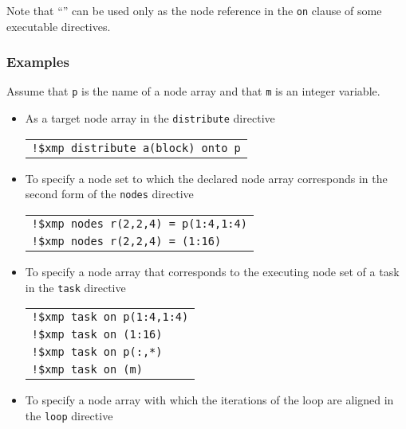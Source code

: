 Note that ``{\tt *}'' can be used only as the node reference in
the {\tt on} clause of some executable directives.


\subsubsection*{Examples}

Assume that {\tt p} is the name of a node array and that {\tt m} is an
integer variable.

\begin{itemize}
\item As a target node array in the {\tt distribute} directive

\begin{tabular}{l}
\verb|!$xmp distribute a(block) onto p| \\
\end{tabular}%

\item To specify a node set to which the declared node array corresponds
      in the second form of the {\tt nodes} directive

\begin{tabular}{l}
\verb|!$xmp nodes r(2,2,4) = p(1:4,1:4)| \\
\verb|!$xmp nodes r(2,2,4) = (1:16)| \\
\end{tabular}

\item To specify a node array that corresponds to the executing node set
      of a task in the {\tt task} directive

\begin{tabular}{l}
\verb|!$xmp task on p(1:4,1:4)| \\
\verb|!$xmp task on (1:16)| \\
\verb|!$xmp task on p(:,*)| \\
\verb|!$xmp task on (m)| \\
\end{tabular}

\item To specify a node array with which the iterations of the loop are
      aligned in the {\tt loop} directive


\end{itemize}
